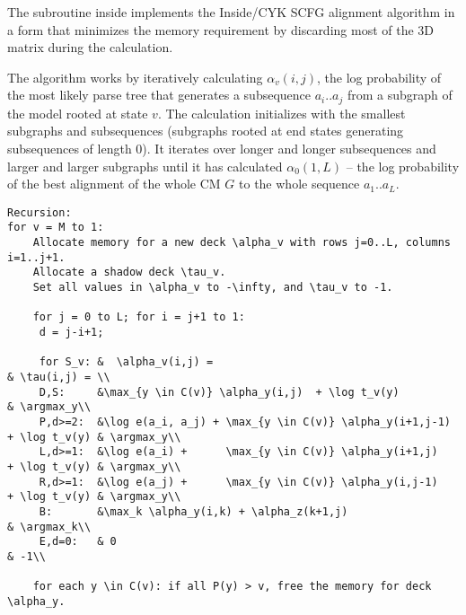 \documentclass[11pt]{article}
\def\argmax{\mbox{\rm{argmax}}}      %
\begin{document}
The subroutine inside implements the Inside/CYK SCFG alignment
algorithm in a form that minimizes the memory requirement by
discarding most of the 3D matrix during the calculation.

The algorithm works by iteratively calculating $\alpha_v(i,j)$, the
log probability of the most likely parse tree that generates a
subsequence $a_i..a_j$ from a subgraph of the model rooted at state
$v$. The calculation initializes with the smallest subgraphs and
subsequences (subgraphs rooted at end states generating subsequences
of length 0). It iterates over longer and longer subsequences and
larger and larger subgraphs until it has calculated $\alpha_0(1,L)$ --
the log probability of the best alignment of the whole CM $G$ to the
whole sequence $a_1..a_L$.

\begin{verbatim}
Recursion:
for v = M to 1:
    Allocate memory for a new deck \alpha_v with rows j=0..L, columns i=1..j+1.
    Allocate a shadow deck \tau_v.
    Set all values in \alpha_v to -\infty, and \tau_v to -1.

    for j = 0 to L; for i = j+1 to 1:
     d = j-i+1;
     
     for S_v: &  \alpha_v(i,j) =                                                    & \tau(i,j) = \\
     D,S:     &\max_{y \in C(v)} \alpha_y(i,j)  + \log t_v(y)	                    & \argmax_y\\
     P,d>=2:  &\log e(a_i, a_j) + \max_{y \in C(v)} \alpha_y(i+1,j-1) + \log t_v(y) & \argmax_y\\
     L,d>=1:  &\log e(a_i) +      \max_{y \in C(v)} \alpha_y(i+1,j)   + \log t_v(y) & \argmax_y\\
     R,d>=1:  &\log e(a_j) +      \max_{y \in C(v)} \alpha_y(i,j-1)   + \log t_v(y) & \argmax_y\\
     B:       &\max_k \alpha_y(i,k) + \alpha_z(k+1,j)                               & \argmax_k\\
     E,d=0:   & 0                                                                   & -1\\

    for each y \in C(v): if all P(y) > v, free the memory for deck \alpha_y.
\end{verbatim}
\end{document}
